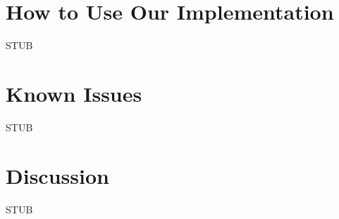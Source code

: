 \documentclass[11pt, onecolumn]{article}
\begin{document}
\section{How to Use Our Implementation}

STUB


\section{Known Issues}

STUB


\section{Discussion}

STUB
\end{document}
